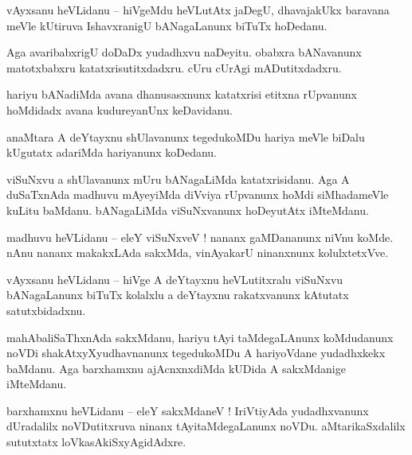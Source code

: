 \documentclass{article}
\begin{document}
\begin{mng}%
vAyxsanu heVLidanu -- hiVgeMdu heVLutAtx jaDegU, dhavajakUkx baravana meVle kUtiruva IshavxranigU 
bANagaLanunx biTuTx hoDedanu.
\end{mng}

\begin{mng}%
Aga avaribabxrigU doDaDx yudadhxvu naDeyitu. obabxra bANavanunx matotxbabxru katatxrisutitxdadxru. 
cUru cUrAgi mADutitxdadxru.
\end{mng}

\begin{mng}%
hariyu bANadiMda avana dhanusasxnunx katatxrisi etitxna rUpvanunx hoMdidadx avana kudureyanUnx 
keDavidanu.
\end{mng}

\begin{mng}%
anaMtara A deYtayxnu shUlavanunx tegedukoMDu hariya meVle biDalu kUgutatx adariMda hariyanunx 
koDedanu.
\end{mng}

\begin{mng}%
viSuNxvu a shUlavanunx mUru bANagaLiMda katatxrisidanu. Aga A duSaTxnAda madhuvu mAyeyiMda diVviya 
rUpvanunx hoMdi siMhadameVle kuLitu baMdanu. bANagaLiMda viSuNxvanunx hoDeyutAtx iMteMdanu.
\end{mng}

\begin{mng}%
madhuvu heVLidanu -- eleY viSuNxveV ! nananx gaMDananunx niVnu koMde. nAnu nananx makakxLAda 
sakxMda, vinAyakarU ninanxnunx kolulxtetxVve.
\end{mng}

\begin{mng}%
vAyxsanu heVLidanu -- hiVge A deYtayxnu heVLutitxralu viSuNxvu bANagaLanunx biTuTx kolalxlu a 
deYtayxnu rakatxvanunx kAtutatx satutxbidadxnu.
\end{mng}

\begin{mng}%
mahAbaliSaThxnAda sakxMdanu, hariyu tAyi taMdegaLAnunx koMdudanunx noVDi shakAtxyXyudhavnanunx 
tegedukoMDu A hariyoVdane yudadhxkekx baMdanu. Aga barxhamxnu ajAcnxnxdiMda kUDida A sakxMdanige 
iMteMdanu.
\end{mng}

\begin{mng}%
barxhamxnu heVLidanu -- eleY sakxMdaneV ! IriVtiyAda yudadhxvanunx dUradalilx noVDutitxruva ninanx 
tAyitaMdegaLanunx noVDu. aMtarikaSxdalilx sututxtatx loVkasAkiSxyAgidAdxre.
\end{mng}
\end{document}
